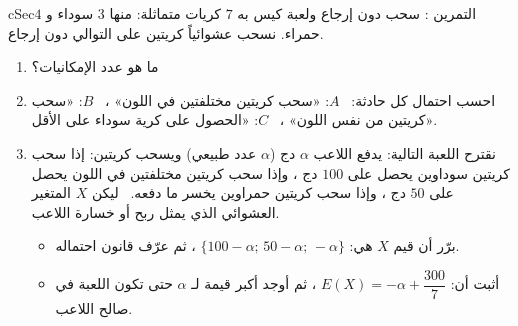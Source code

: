 \documentclass[12pt,a4paper]{article}
\newenvironment{BOX}[2]{\begin{otherlanguage}{english}\begin{arbox}{#1}{#2}}{\end{arbox}\end{otherlanguage}}
\newcounter{exo}
\newenvironment{tamrin}[1]{\stepcounter{exo}\begin{BOX}{cSec}{التمرين \theexo: #1}}{\end{BOX}}
\newenvironment{sq}{\begin{itemize}[leftmargin=2.4em,itemsep=3pt]}{\end{itemize}}
\newcommand{\qa}{\item[(أ)]}\newcommand{\qb}{\item[(ب)]}\newcommand{\qc}{\item[(جـ)]}\newcommand{\qd}{\item[(د)]}\newcommand{\qe}{\item[(هـ)]}
\begin{document}
\begin{tamrin}{سحب دون إرجاع ولعبة}
كيس به $7$ كريات متماثلة: منها $3$ سوداء و $4$ حمراء. نسحب عشوائياً كريتين على التوالي دون إرجاع.
\begin{enumerate}
\item ما هو عدد الإمكانيات؟
\item احسب احتمال كل حادثة: \ $A$: «سحب كريتين مختلفتين في اللون» ، \ $B$: «سحب كريتين من نفس اللون» ، \ $C$: «الحصول على كرية سوداء على الأقل».
\item نقترح اللعبة التالية: يدفع اللاعب $\alpha$ دج ($\alpha$ عدد طبيعي) ويسحب كريتين: إذا سحب كريتين سوداوين يحصل على $100$ دج ، وإذا سحب كريتين مختلفتين في اللون يحصل على $50$ دج ، وإذا سحب كريتين حمراوين يخسر ما دفعه. \ ليكن $X$ المتغير العشوائي الذي يمثل ربح أو خسارة اللاعب.
\begin{sq}
\qa برّر أن قيم $X$ هي: $\{100-\alpha;\,50-\alpha;\,-\alpha\}$ ، ثم عرّف قانون احتماله.
\qb أثبت أن: $E(X)=-\alpha+\dfrac{300}{7}$ ، ثم أوجد أكبر قيمة لـ $\alpha$ حتى تكون اللعبة في صالح اللاعب.
\end{sq}
\end{enumerate}
\end{tamrin}
\end{document}
